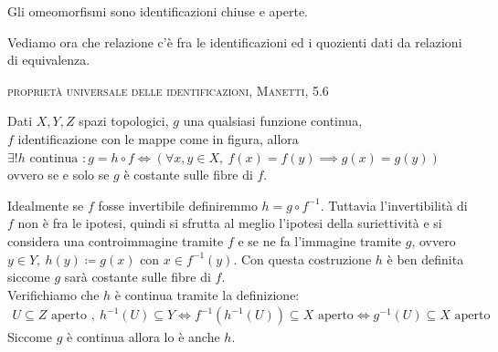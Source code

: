 \begin{observe}
	Gli omeomorfismi sono identificazioni chiuse e aperte.
\end{observe}

Vediamo ora che relazione c'è fra le identificazioni ed i quozienti dati da relazioni di equivalenza.
\begin{theorema} \textsc{proprietà universale delle identificazioni, Manetti, 5.6} \\
	\begin{minipage}[t]{0.83\textwidth}
		Dati $X,Y,Z$ spazi topologici, $g$ una qualsiasi funzione continua, \\
		$f$ identificazione con le mappe come in figura, allora \\
		$\exists ! h \text{ continua } \colon g=h\circ f \iff \left( \forall x,y\in X, \ f(x)=f(y)\implies g(x)=g(y)  \right)$ \\
		ovvero se e solo se $g$ è costante sulle fibre di $f$.
	\end{minipage}
	\begin{minipage}[t]{0.13\textwidth}\vspace{-10pt}
	\end{minipage}
\end{theorema}
\begin{demonstration}
	Idealmente se $f$ fosse invertibile definiremmo $h=g\circ f^{-1}$. Tuttavia l'invertibilità di $f$ non è fra le ipotesi, quindi si sfrutta al meglio l'ipotesi della suriettività e si considera una controimmagine tramite $f$ e se ne fa l'immagine tramite $g$, ovvero $y\in Y, \ h(y)\coloneqq g(x)$ con $x\in f^{-1}(y)$. Con questa costruzione $h$ è ben definita siccome $g$ sarà costante sulle fibre di $f$. \\
	Verifichiamo che $h$ è continua tramite la definizione:
		\begin{gather*}
			U\subseteq Z \text{ aperto }, \ h^{-1}(U)\subseteq Y \iff f^{-1}(h^{-1}(U))\subseteq X \text{ aperto} \iff g^{-1}(U)\subseteq X \text{ aperto}
		\end{gather*}
	Siccome $g$ è continua allora lo è anche $h$.
\end{demonstration}

